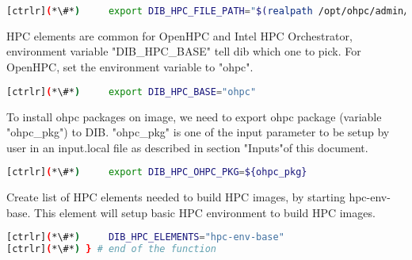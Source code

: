 \begin{lstlisting}[language=bash,keywords={}]
[ctrlr](*\#*)     export DIB_HPC_FILE_PATH="$(realpath /opt/ohpc/admin/dib-chpc/hpc-files/)"
\end{lstlisting}

	HPC elements are common for OpenHPC and Intel HPC Orchestrator, environment variable \newline
	"DIB\_HPC\_BASE" tell dib which one to pick. For OpenHPC, set the environment variable to "ohpc".

\begin{lstlisting}[language=bash,keywords={}]
[ctrlr](*\#*)     export DIB_HPC_BASE="ohpc"
\end{lstlisting}

	To install ohpc packages on image, we need to export ohpc package (variable "ohpc\_pkg") to DIB. "ohpc\_pkg" is one of the input parameter to be setup by user in an input.local file as described in section "Inputs"of this document.

\begin{lstlisting}[language=bash,keywords={}]
[ctrlr](*\#*)     export DIB_HPC_OHPC_PKG=${ohpc_pkg}
\end{lstlisting}

	Create list of HPC elements needed to build HPC images, by starting hpc-env-base. This element will setup basic HPC environment to build HPC images.

\begin{lstlisting}[language=bash,keywords={}]
[ctrlr](*\#*)     DIB_HPC_ELEMENTS="hpc-env-base"
[ctrlr](*\#*) } # end of the function
\end{lstlisting}
